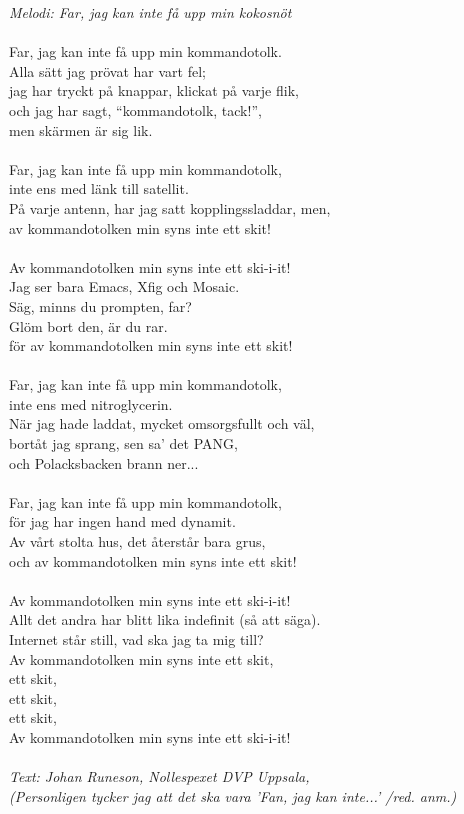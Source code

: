 {\footnotesize\textit{Melodi: Far, jag kan inte få upp min kokosnöt}}\\
\\
Far, jag kan inte få upp min kommandotolk.\\
Alla sätt jag prövat har vart fel;\\
jag har tryckt på knappar, klickat på varje flik,\\
och jag har sagt, “kommandotolk, tack!”,\\
men skärmen är sig lik.\\
\\
Far, jag kan inte få upp min kommandotolk,\\
inte ens med länk till satellit.\\
På varje antenn, har jag satt kopplingssladdar, men,\\
av kommandotolken min syns inte ett skit!\\
\\
Av kommandotolken min syns inte ett ski-i-it!\\
Jag ser bara Emacs, Xfig och Mosaic.\\
Säg, minns du prompten, far?\\
Glöm bort den, är du rar.\\
för av kommandotolken min syns inte ett skit!\\
\\
Far, jag kan inte få upp min kommandotolk,\\
inte ens med nitroglycerin.\\
När jag hade laddat, mycket omsorgsfullt och väl,\\
bortåt jag sprang, sen sa’ det PANG,\\
och Polacksbacken brann ner...\\
\\
Far, jag kan inte få upp min kommandotolk,\\
för jag har ingen hand med dynamit.\\
Av vårt stolta hus, det återstår bara grus,\\
och av kommandotolken min syns inte ett skit!\\
\\
Av kommandotolken min syns inte ett ski-i-it!\\
Allt det andra har blitt lika indefinit (så att säga).\\
Internet står still, vad ska jag ta mig till?\\
Av kommandotolken min syns inte ett skit,\\
ett skit,\\
ett skit,\\
ett skit,\\
Av kommandotolken min syns inte ett ski-i-it!\\
\\
{\footnotesize\textit{Text: Johan Runeson, Nollespexet DVP Uppsala,
    \\ (Personligen tycker jag att det ska vara
    ’Fan, jag kan inte...’ /red. anm.)}}
